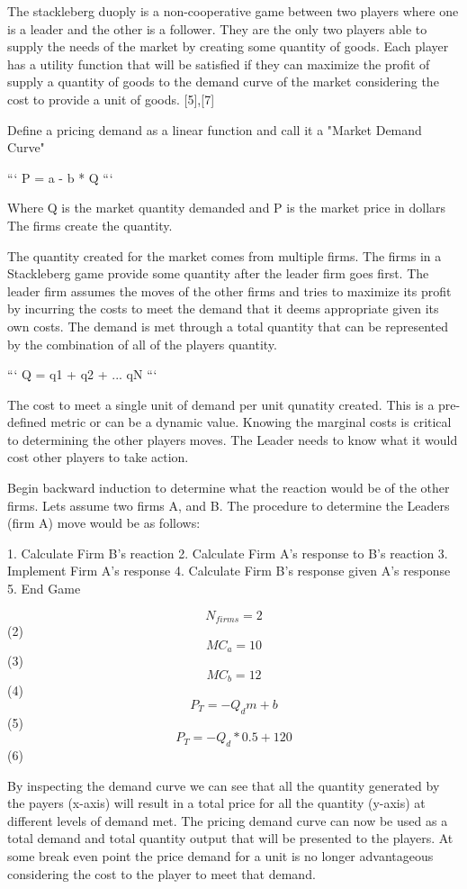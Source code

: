 The stackleberg duoply is a non-cooperative game between two players 
where one is a leader and the other is a follower. They are the only 
two players able to supply the needs of the market by creating some 
quantity of goods. Each player has a utility function that will be 
satisfied if they can maximize the profit of supply a quantity of 
goods to the demand curve of the market considering the cost to provide 
a unit of goods.  [5],[7]

Define a pricing demand as a linear function and call it a 
"Market Demand Curve"

```
P = a  -  b * Q
```

Where Q is the market quantity demanded and P is the market price in dollars
The firms create the quantity.

The quantity created for the market comes from multiple firms. 
The firms in a Stackleberg game provide some quantity after the 
leader firm goes first. The leader firm assumes the moves of the 
other firms and tries to maximize its profit by incurring the costs 
to meet the demand that it deems appropriate given its own costs. 
The demand is met through a total quantity that can be represented 
by the combination of all of the players quantity. 

```
Q = q1 + q2 + ... qN
```

The cost to meet a single unit of demand per unit qunatity created. 
This is a pre-defined metric or can be a dynamic value. Knowing the 
marginal costs is critical to determining the other players moves. 
The Leader needs to know what it would cost other players to take action.

Begin backward induction to determine what the reaction would be of 
the other firms. Lets assume two firms A, and B. The procedure to 
determine the Leaders (firm A) move would be as follows:

1. Calculate Firm B's reaction
2. Calculate Firm A's response to B's reaction
3. Implement Firm A's response
4. Calculate Firm B's response given A's response
5. End Game

$$ N_{firms} = 2$$ (2)
$$ MC_{a} = 10$$ (3)
$$ MC_{b} = 12$$ (4)
$$ P_{T} = -Q_{d}m+b$$ (5)
$$ P_{T} = -Q_{d}*0.5+120$$ (6)

By inspecting the demand curve we can see that all the quantity 
generated by the payers (x-axis) will result in a total price for 
all the quantity (y-axis) at different levels of demand met. 
The pricing demand curve can now be used as a total demand and 
total quantity output that will be presented to the players. 
At some break even point the price demand for a unit is no longer 
advantageous considering the cost to the player to meet that demand.

